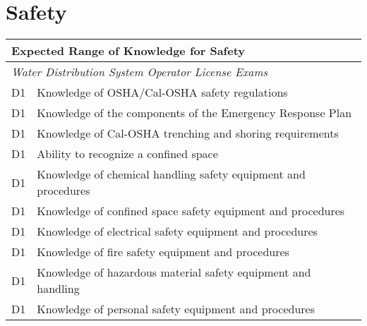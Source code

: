 \chapter{Safety}



\begin{table}[H]
\begin{tabular}{| m{1cm} | m{15cm} |}
\hline
\multicolumn{2}{|l|}{\textbf{Expected   Range of Knowledge for Safety}}                                                                          \\ \hline
\multicolumn{2}{|l|}{\textit{Water   Distribution System Operator License Exams}}                                                                                      \\ \hline
D1 & Knowledge of   OSHA/Cal-OSHA safety regulations                                                                                   \\ \hline
D1 & Knowledge of the   components of the Emergency Response Plan                                                                      \\ \hline
D1 & Knowledge of Cal-OSHA   trenching and shoring requirements                                                                        \\ \hline
D1 & Ability to recognize   a confined space                                                                                           \\ \hline
D1 & Knowledge of chemical   handling safety equipment and procedures                                                                  \\ \hline
D1 & Knowledge of confined   space safety equipment and procedures                                                                     \\ \hline
D1 & Knowledge of   electrical safety equipment and procedures                                                                         \\ \hline
D1 & Knowledge of fire   safety equipment and procedures                                                                               \\ \hline
D1 & Knowledge of   hazardous material safety equipment and handling                                                                   \\ \hline
D1 & Knowledge of personal   safety equipment and procedures                                                                           \\ \hline

\end{tabular}
\end{table}
